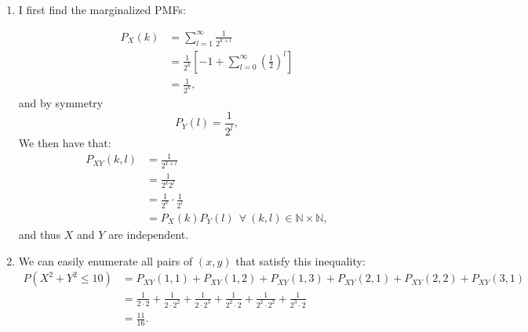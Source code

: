 \begin{problem}{4} $ $
\begin{enumerate}
\item  I first find the marginalized PMFs:

\begin{align*}
P_X(k) &= \sum_{l=1}^\infty \frac{1}{2^{k+l}} \\
&= \frac{1}{2^k}\left [-1 +  \sum_{l=0}^\infty \left(\frac{1}{2}\right)^l \right] \\
&=\frac{1}{2^k},
\end{align*}
and by symmetry
\begin{equation*}
P_Y(l)=\frac{1}{2^l},
\end{equation*}
We then have that:
\begin{align*}
P_{XY}(k, l) &= \frac{1}{2^{k+l}} \\
&= \frac{1}{2^k 2^l} \\
&= \frac{1}{2^k}\cdot \frac{1}{2^l} \\
&= P_X(k)P_Y(l) ~~\forall ~(k, l) \in \mathbb N \times \mathbb N,
\end{align*}
and thus $X$ and $Y$ are independent.

\item We can easily enumerate all pairs of $(x, y)$ that satisfy this inequality:
\begin{align*}
P(X^2+Y^2 \le 10) &= P_{XY}(1, 1)+P_{XY}(1, 2)+P_{XY}(1, 3)+P_{XY}(2, 1)+P_{XY}(2, 2)+P_{XY}(3, 1) \\
& =\frac{1}{2\cdot 2}+\frac{1}{2\cdot 2^2}+\frac{1}{2\cdot 2^3}+\frac{1}{2^2\cdot 2}+\frac{1}{2^2\cdot 2^2}+\frac{1}{2^3\cdot 2} \\
& = \frac{11}{16}.
\end{align*}

\end{enumerate}
\end{problem}

